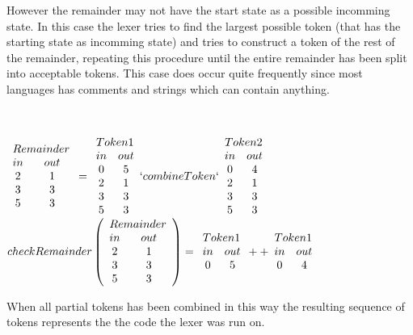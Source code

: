 However the remainder may not have the start state as a possible incomming state.
In this case the lexer tries to find the largest possible token (that has the
starting state as incomming state) and tries to construct a token of the rest of
the remainder, repeating this procedure until the entire remainder has been
split into acceptable tokens. This case does occur quite frequently since most
languages has comments and strings which can contain anything.
\begin{example}\label{remToken}
\mbox{}\\
\begin{center}
$\begin{array}{cc}\multicolumn{2}{c}{Remainder}\\
in & out\\
2 & 1\\
3 & 3\\
5 & 3\\
\end{array}
=
\begin{array}{cc}\multicolumn{2}{c}{Token 1}\\
in & out\\
0 & 5\\
2 & 1\\
3 & 3\\
5 & 3\\
\end{array} `combineToken`
\begin{array}{cc}\multicolumn{2}{c}{Token 2}\\
in & out\\
0 & 4\\
2 & 1\\
3 & 3\\
5 & 3\\
\end{array}$\\
$checkRemainder \left(\begin{array}{cc}\multicolumn{2}{c}{Remainder}\\
in & out\\
2 & 1\\
3 & 3\\
5 & 3\\
\end{array} \right)
=
\begin{array}{cc}\multicolumn{2}{c}{Token 1}\\
in & out\\
0 & 5\\
\end{array} ++
\begin{array}{cc}\multicolumn{2}{c}{Token 1}\\
in & out\\
0 & 4\\
\end{array}
$
\end{center}
\end{example}
When all partial tokens has been combined in this way the resulting sequence of
tokens represents the the code the lexer was run on.

